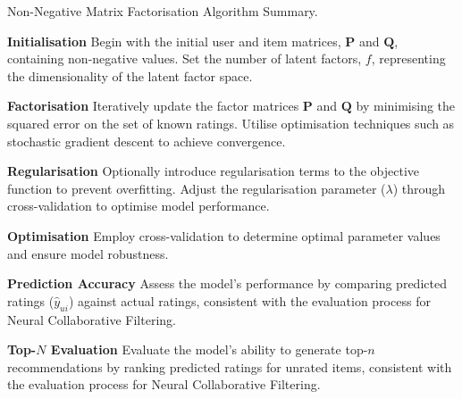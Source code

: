 \begin{algorithm}
    \caption{Non-Negative Matrix Factorisation Algorithm Summary.}
    \label{alg:nmf_alg}
    \begin{algorithmic}[1]
      \State \textbf{Initialisation}
       \newline \quad Begin with the initial user and item matrices, $\mathbf{P}$ and $\mathbf{Q}$, containing non-negative values.
       \newline \quad Set the number of latent factors, $f$, representing the dimensionality of the latent factor space.
    
      \State \textbf{Factorisation}
       \newline \quad Iteratively update the factor matrices $\mathbf{P}$ and $\mathbf{Q}$ by minimising the squared error on the set of known ratings.
       \newline \quad Utilise optimisation techniques such as stochastic gradient descent to achieve convergence.
    
      \State \textbf{Regularisation}
       \newline \quad Optionally introduce regularisation terms to the objective function to prevent overfitting.
       \newline \quad Adjust the regularisation parameter ($\lambda$) through cross-validation to optimise model performance.
        
      \State \textbf{Optimisation}
       \newline \quad Employ cross-validation to determine optimal parameter values and ensure model robustness.
    
      \State \textbf{Prediction Accuracy}
       \newline \quad Assess the model's performance by comparing predicted ratings ($\hat{y}_{u i}$) against actual ratings, consistent with the evaluation process for Neural Collaborative Filtering.
    
      \State \textbf{Top-$N$ Evaluation}
       \newline \quad Evaluate the model's ability to generate top-$n$ recommendations by ranking predicted ratings for unrated items, consistent with the evaluation process for Neural Collaborative Filtering.
    \end{algorithmic}
    \end{algorithm}
    
